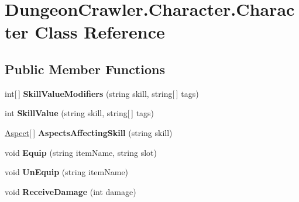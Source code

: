 \hypertarget{class_dungeon_crawler_1_1_character_1_1_character}{}\section{Dungeon\+Crawler.\+Character.\+Character Class Reference}
\label{class_dungeon_crawler_1_1_character_1_1_character}
\subsection*{Public Member Functions}
\begin{DoxyCompactItemize}
\item 
\hypertarget{class_dungeon_crawler_1_1_character_1_1_character_aa51632042f5a643c92f9448fb1b1f2d3}{}int\mbox{[}$\,$\mbox{]} {\bfseries Skill\+Value\+Modifiers} (string skill, string\mbox{[}$\,$\mbox{]} tags)\label{class_dungeon_crawler_1_1_character_1_1_character_aa51632042f5a643c92f9448fb1b1f2d3}

\item 
\hypertarget{class_dungeon_crawler_1_1_character_1_1_character_ac7a76a986b94456d8bc1e11ce3ca1fb0}{}int {\bfseries Skill\+Value} (string skill, string\mbox{[}$\,$\mbox{]} tags)\label{class_dungeon_crawler_1_1_character_1_1_character_ac7a76a986b94456d8bc1e11ce3ca1fb0}

\item 
\hypertarget{class_dungeon_crawler_1_1_character_1_1_character_a11466af89a3a3568e67ccbdcd09459c0}{}\hyperlink{class_dungeon_crawler_1_1_core_1_1_aspect}{Aspect}\mbox{[}$\,$\mbox{]} {\bfseries Aspects\+Affecting\+Skill} (string skill)\label{class_dungeon_crawler_1_1_character_1_1_character_a11466af89a3a3568e67ccbdcd09459c0}

\item 
\hypertarget{class_dungeon_crawler_1_1_character_1_1_character_a60ed0daf6e2a281318dc35effe82566c}{}void {\bfseries Equip} (string item\+Name, string slot)\label{class_dungeon_crawler_1_1_character_1_1_character_a60ed0daf6e2a281318dc35effe82566c}

\item 
\hypertarget{class_dungeon_crawler_1_1_character_1_1_character_a625216059f7c3d1dfa61bd93ac32c8be}{}void {\bfseries Un\+Equip} (string item\+Name)\label{class_dungeon_crawler_1_1_character_1_1_character_a625216059f7c3d1dfa61bd93ac32c8be}

\item 
\hypertarget{class_dungeon_crawler_1_1_character_1_1_character_af4d0724811374b91bb6257b4fef2cb9a}{}void {\bfseries Receive\+Damage} (int damage)\label{class_dungeon_crawler_1_1_character_1_1_character_af4d0724811374b91bb6257b4fef2cb9a}


\end{DoxyCompactItemize}
